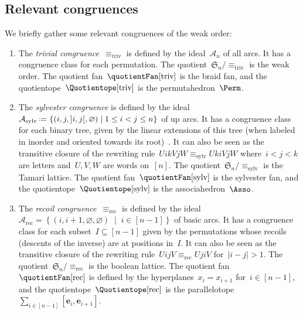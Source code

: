 \documentclass{amsart}
\theoremstyle{definition}
\newcommand{\f}[1]{{\mathfrak{#1}}} %
\renewcommand{\b}[1]{{\boldsymbol{#1}}} %
\newcommand{\set}[2]{\left\{ #1 \;\middle|\; #2 \right\}} %
\newcommand{\eqdef}{\mbox{\,\raisebox{0.2ex}{\scriptsize\ensuremath{\mathrm:}}\ensuremath{=}\,}} %
\newcommand{\darkblue}{\color{darkblue}} %
\newcommand{\defn}[1]{\textsl{\darkblue #1}} %
\newcommand{\vincent}[1]{\todo[color=blue!30]{#1 \\ \hfill --- V.}}
\newcommand{\arcs}{{\mathcal{A}}} %
\begin{document}

\subsection{Relevant congruences}
\label{subsec:relevantCongruences}

We briefly gather some relevant congruences of the weak order:
\vincent{Not sure we need all of them}

\begin{enumerate}
\item \label{item:trivialCongruence}
The \defn{trivial congruence}~$\equiv_\textrm{triv}$ is defined by the ideal~$\arcs_n$ of all arcs.
It has a congruence class for each permutation.
The quotient~$\f{S}_n/{\equiv_\textrm{triv}}$ is the weak order.
The quotient fan~$\quotientFan[\textrm{triv}]$ is the braid fan, and the quotientope~$\Quotientope[\textrm{triv}]$ is the permutahedron~$\Perm$.

\item \label{item:sylvesterCongruence}
The \defn{sylvester congruence} is defined by the ideal~$\arcs_\textrm{sylv} \eqdef \set{(i, j, {]i,j[}, \varnothing)}{1 \le i < j \le n}$ of up arcs.
It has a congruence class for each binary tree, given by the linear extensions of this tree (when labeled in inorder and oriented towards its root)~\cite{Tonks, HivertNovelliThibon-algebraBinarySearchTrees}.
It can also be seen as the transitive closure of the rewriting rule~$U i k V j W \equiv_\textrm{sylv} U k i V j W$ where~$i < j < k$ are letters and~$U,V,W$ are words on~$[n]$.
The quotient~$\f{S}_n/{\equiv_\textrm{sylv}}$ is the Tamari lattice.
The quotient fan~$\quotientFan[\textrm{sylv}]$ is the sylvester fan, and the quotientope~$\Quotientope[\textrm{sylv}]$ is the associahedron~$\Asso$.

\item \label{item:recoilCongruence}
The \defn{recoil congruence}~$\equiv_\textrm{rec}$ is defined by the ideal~$\arcs_\textrm{rec} = \set{(i, i+1, \varnothing, \varnothing)}{i \in [n-1]}$ of basic arcs.
It has a congruence class for each subset~$I \subseteq [n-1]$ given by the permutations whose recoils (descents of the inverse) are at positions in~$I$.
It can also be seen as the transitive closure of the rewriting rule~$U i j V \equiv_{\textrm{rec}} U j i V$ for~$|i - j| > 1$.
The quotient~$\f{S}_n/{\equiv_\textrm{rec}}$ is the boolean lattice.
The quotient fan~$\quotientFan[\textrm{rec}]$ is defined by the hyperplanes~$x_i = x_{i+1}$ for~$i \in [n-1]$, and the quotientope~$\Quotientope[\textrm{rec}]$ is the parallelotope~$\sum_{i \in [n-1]} [\b{e}_i, \b{e}_{i+1}]$.


\end{enumerate}
\end{document}

